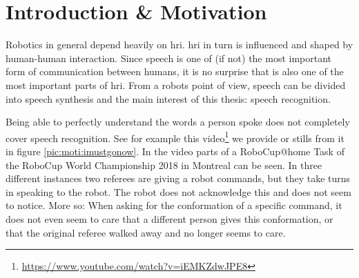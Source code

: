 
\chapter{Introduction \& Motivation}
\label{motiv:start}

Robotics in general depend heavily on \gls{hri}.%
\gls{hri} in turn is influenced and shaped by human-human interaction.
Since speech is one of (if not) the most important form of communication between humans, it is no surprise that is also one of the most important parts of \gls{hri}.
From a robots point of view, speech can be divided into speech synthesis and the main interest of this thesis: speech recognition.

Being able to perfectly understand the words a person spoke does not completely cover speech recognition.
See for example this video\footnote{\url{https://www.youtube.com/watch?v=iEMKZdwJPE8}} we provide or stills from it in figure \ref{pic:moti:imustgonow}.
In the video parts of a RoboCup@home Task of the RoboCup World Championship 2018 in Montreal can be seen.
In three different instances two referees are giving a robot commands, but they take turns in speaking to the robot.
The robot does not acknowledge this and does not seem to notice.
More so: When asking for the conformation of a specific command, it does not even seem to care that a different person gives this conformation, or that the original referee walked away and no longer seems to care.

